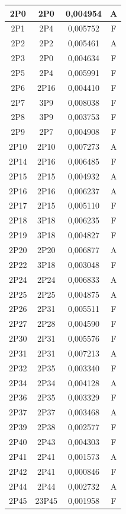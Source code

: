 \documentclass[spanish,openright]{book}
\begin{document}
\begin{center}
\begin{longtable}{|c|c|c|c|}
\hline	2P0	&	2P0	&	0,004954	&	A	\\
\hline	2P1	&	2P4	&	0,005752	&	F	\\
\hline	2P2	&	2P2	&	0,005461	&	A	\\
\hline	2P3	&	2P0	&	0,004634	&	F	\\
\hline	2P5	&	2P4	&	0,005991	&	F	\\
\hline	2P6	&	2P16	&	0,004410	&	F	\\
\hline	2P7	&	3P9	&	0,008038	&	F	\\
\hline	2P8	&	3P9	&	0,003753	&	F	\\
\hline	2P9	&	2P7	&	0,004908	&	F	\\
\hline	2P10	&	2P10	&	0,007273	&	A	\\
\hline	2P14	&	2P16	&	0,006485	&	F	\\
\hline	2P15	&	2P15	&	0,004932	&	A	\\
\hline	2P16	&	2P16	&	0,006237	&	A	\\
\hline	2P17	&	2P15	&	0,005110	&	F	\\
\hline	2P18	&	3P18	&	0,006235	&	F	\\
\hline	2P19	&	3P18	&	0,004827	&	F	\\
\hline	2P20	&	2P20	&	0,006877	&	A	\\
\hline	2P22	&	3P18	&	0,003048	&	F	\\
\hline	2P24	&	2P24	&	0,006833	&	A	\\
\hline	2P25	&	2P25	&	0,004875	&	A	\\
\hline	2P26	&	2P31	&	0,005511	&	F	\\
\hline	2P27	&	2P28	&	0,004590	&	F	\\
\hline	2P30	&	2P31	&	0,005576	&	F	\\
\hline	2P31	&	2P31	&	0,007213	&	A	\\
\hline	2P32	&	2P35	&	0,003340	&	F	\\
\hline	2P34	&	2P34	&	0,004128	&	A	\\
\hline	2P36	&	2P35	&	0,003329	&	F	\\
\hline	2P37	&	2P37	&	0,003468	&	A	\\
\hline	2P39	&	2P38	&	0,002577	&	F	\\
\hline	2P40	&	2P43	&	0,004303	&	F	\\
\hline	2P41	&	2P41	&	0,001573	&	A	\\
\hline	2P42	&	2P41	&	0,000846	&	F	\\
\hline	2P44	&	2P44	&	0,002732	&	A	\\
\hline	2P45	&	23P45	&	0,001958	&	F	\\

\end{longtable}
\end{center}
\end{document}
